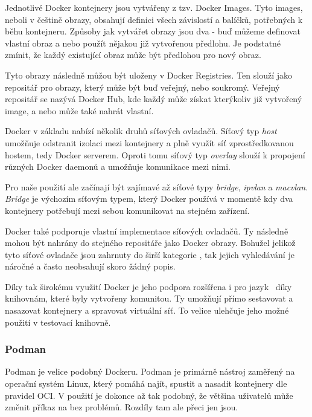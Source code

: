 Jednotlivé Docker kontejnery jsou vytvářeny z tzv. Docker Images. Tyto images, neboli v češtině obrazy, obsahují definici všech závislostí a balíčků, potřebných k běhu kontejneru. Způsoby jak vytvářet obrazy jsou dva - buď můžeme definovat vlastní obraz a nebo použít nějakou již vytvořenou předlohu. Je podstatné zmínit, že každý existující obraz může být předlohou pro nový obraz. 

Tyto obrazy následně můžou být uloženy v Docker Registries. Ten slouží jako repositář pro obrazy, který může být buď veřejný, nebo soukromý. Veřejný repositář se nazývá Docker Hub, kde každý může získat kterýkoliv již vytvořený image, a nebo může také nahrát vlastní. \cite{turnbull2014docker} 

Docker v základu nabízí několik druhů síťových ovladačů. Síťový typ \textit{host} umožňuje odstranit izolaci mezi kontejnery a plně využít síť zprostředkovanou hostem, tedy Docker serverem. Oproti tomu síťový typ \textit{overlay} slouží k propojení různých Docker daemonů a umožňuje komunikace mezi nimi. 

Pro naše použití ale začínají být zajímavé až síťové typy \textit{bridge}, \textit{ipvlan} a \textit{macvlan}. \textit{Bridge} je výchozím síťovým typem, který Docker používá v momentě kdy dva kontejnery potřebují mezi sebou komunikovat na stejném zařízení. 


Docker také podporuje vlastní implementace síťových ovladačů. Ty následně mohou být nahrány do stejného repositáře jako Docker obrazy. Bohužel jelikož tyto síťové ovladače jsou zahrnuty do širší kategorie , tak jejich vyhledávání je náročné a často neobsahují skoro žádný popis. \cite{docker_networking_overview}\cite{docker_brige_overview}

Díky tak širokému využití Docker je jeho podpora rozšířena i pro jazyk \csharp~díky knihovnám, které byly vytvořeny komunitou. Ty umožňují přímo sestavovat a nasazovat kontejnery a spravovat virtuální síť. To velice ulehčuje jeho možné použití v testovací knihovně. 

\subsubsection{Podman}
Podman je velice podobný Dockeru. Podman je primárně nástroj zaměřený na operační systém Linux, který pomáhá najít, spustit a nasadit kontejnery dle pravidel OCI. V použití je dokonce až tak podobný, že většina uživatelů může změnit příkaz  na  bez problémů. Rozdíly tam ale přeci jen jsou. 


